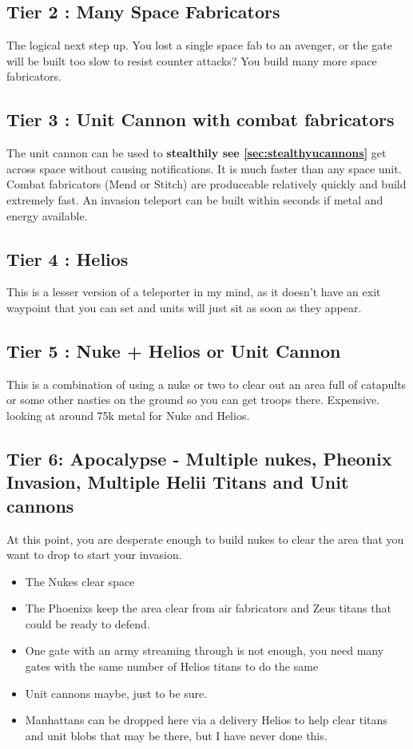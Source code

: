 \documentclass[]{article}
\begin{document}
\subsection{Tier 2 : Many Space Fabricators}

The logical next step up.  You lost a single space fab to an avenger, or the gate will be built too slow to resist counter attacks?  You build many more space fabricators.  

\subsection{Tier 3 : Unit Cannon with combat fabricators}

The unit cannon can be used to \textbf{stealthily see \ref{sec:stealthyucannons}} get across space without causing notifications.  It is much faster than any space unit.  Combat fabricators (Mend or Stitch) are produceable relatively quickly and build extremely fast.  An invasion teleport can be built within seconds if metal and energy available. 

\subsection{Tier 4 : Helios}

This is a lesser version of a teleporter in my mind, as it doesn't have an exit waypoint that you can set and units will just sit as soon as they appear.  

\subsection{Tier 5 : Nuke + Helios or Unit Cannon}

This is a combination of using a nuke or two to clear out an area full of catapults or some other nasties on the ground so you can get troops there.  Expensive.  looking at around 75k metal for Nuke and Helios.  



\subsection{Tier 6: Apocalypse - Multiple nukes, Pheonix Invasion, Multiple Helii Titans and Unit cannons}

At this point, you are desperate enough to build nukes to clear the area that you want to drop to start your invasion.  

\begin{itemize}
	\item The Nukes clear space
	\item The Phoenixs keep the area clear from air fabricators and Zeus titans that could be ready to defend.  
	\item One gate with an army streaming through is not enough, you need many gates with the same number of Helios titans to do the same
	\item Unit cannons maybe, just to be sure.  
	\item Manhattans can be dropped here via a delivery Helios to help clear titans and unit blobs that may be there, but I have never done this.
\end{itemize}
\end{document}
